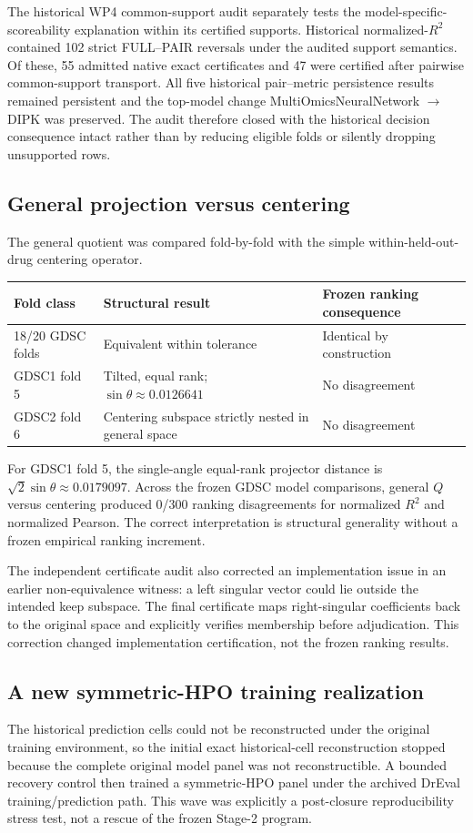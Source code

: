 \documentclass[11pt]{article}
\begin{document}
The historical WP4 common-support audit separately tests the model-specific-scoreability explanation within its certified supports. Historical normalized-$R^2$ contained 102 strict FULL--PAIR reversals under the audited support semantics. Of these, 55 admitted native exact certificates and 47 were certified after pairwise common-support transport. All five historical pair--metric persistence results remained persistent and the top-model change MultiOmicsNeuralNetwork $\rightarrow$ DIPK was preserved. The audit therefore closed with the historical decision consequence intact rather than by reducing eligible folds or silently dropping unsupported rows.


\subsection{General projection versus centering}
The general quotient was compared fold-by-fold with the simple within-held-out-drug centering operator.
\begin{center}
\small
\begin{tabular}{@{}lll@{}}
\toprule
Fold class & Structural result & Frozen ranking consequence \\
\midrule
18/20 GDSC folds & Equivalent within tolerance & Identical by construction \\
GDSC1 fold 5 & Tilted, equal rank; $\sin\theta\approx0.0126641$ & No disagreement \\
GDSC2 fold 6 & Centering subspace strictly nested in general space & No disagreement \\
\bottomrule
\end{tabular}
\end{center}
For GDSC1 fold 5, the single-angle equal-rank projector distance is $\sqrt{2}\sin\theta\approx0.0179097$. Across the frozen GDSC model comparisons, general $Q$ versus centering produced 0/300 ranking disagreements for normalized $R^2$ and normalized Pearson. The correct interpretation is structural generality without a frozen empirical ranking increment.

The independent certificate audit also corrected an implementation issue in an earlier non-equivalence witness: a left singular vector could lie outside the intended keep subspace. The final certificate maps right-singular coefficients back to the original space and explicitly verifies membership before adjudication. This correction changed implementation certification, not the frozen ranking results.


\subsection{A new symmetric-HPO training realization}
The historical prediction cells could not be reconstructed under the original training environment, so the initial exact historical-cell reconstruction stopped because the complete original model panel was not reconstructible. A bounded recovery control then trained a symmetric-HPO panel under the archived DrEval training/prediction path. This wave was explicitly a post-closure reproducibility stress test, not a rescue of the frozen Stage-2 program.
\end{document}
